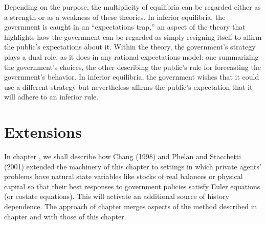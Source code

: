 %
%
%
Depending on the
purpose, the multiplicity of equilibria can be regarded either
as a strength or as a weakness of these theories.
  In inferior equilibria, the government is caught in an
``expectations trap,''
an aspect of the theory that highlights how the government
can be regarded as simply resigning itself to
affirm the public's expectations about it.  Within the theory,
the government's \newpage \noindent strategy plays a dual role, as it does
in any rational expectations model: one summarizing
the government's choices, the other describing the public's
rule for forecasting the government's behavior.
In inferior equilibria, the government  wishes that it  could
use a different strategy but nevertheless
affirms the public's expectation that
it will adhere to an inferior rule.

\section{Extensions}
In chapter , we shall describe how
Chang (1998) and Phelan and Stacchetti (2001)  extended the
  machinery of this chapter to settings in which  private agents' problems
  have natural state variables like stocks of real balances or
  physical capital so that their best responses to government
  policies satisfy  Euler equations (or costate equations).  This will activate an additional source of history dependence.
  The approach of chapter  merges aspects of the method described
  in chapter  and  with those of this chapter.  %



\showchaptIDfalse
\showsectIDfalse
